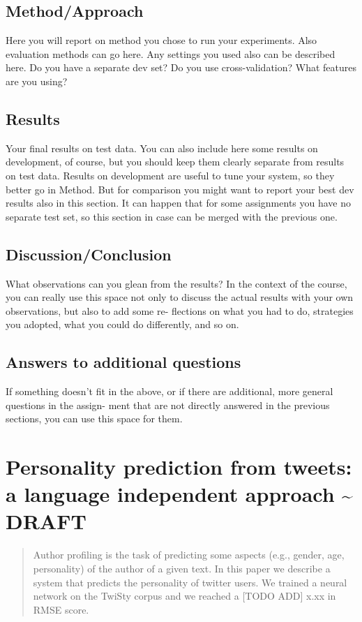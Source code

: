 \documentclass[article,11pt,nofixltx2e]{article}
\begin{document}
\subsection{Method/Approach}
\label{sec-1-4}
Here you will report on method you chose to run your experiments. Also evaluation methods can go here. Any settings you used also can be described here. Do you have a separate dev set? Do you use cross-validation? What features are you using?
\subsection{Results}
\label{sec-1-5}
Your final results on test data. You can also include here some results on development, of course, but you should keep them clearly separate from results on test data. Results on development are useful to tune your system, so they better go in Method.  But for comparison you might want to report your best dev results also in this section. It can happen that for some assignments you have no separate test set, so this section in case can be merged with the previous one.
\subsection{Discussion/Conclusion}
\label{sec-1-6}
What observations can you glean from the results?  In the context of the course, you can really use this space not only to discuss the actual results with your own observations, but also to add some re- flections on what you had to do, strategies you adopted, what you could do differently, and so on.

\subsection{Answers to additional questions}
\label{sec-1-7}
If something doesn’t fit in the above, or if there are additional, more general questions in the assign- ment that are not directly answered in the previous sections, you can use this space for them.
\section{Personality prediction from tweets: a language independent approach \textasciitilde{} DRAFT}
\label{sec-2}

\begin{abstract}
Author profiling is the task of predicting some aspects (e.g., gender, age, personality) of the author of a given text. In this paper we describe a system that predicts the personality of twitter users. We trained a neural network on the TwiSty corpus and we reached a [TODO ADD] x.xx in RMSE score.
\end{abstract}
\end{document}
